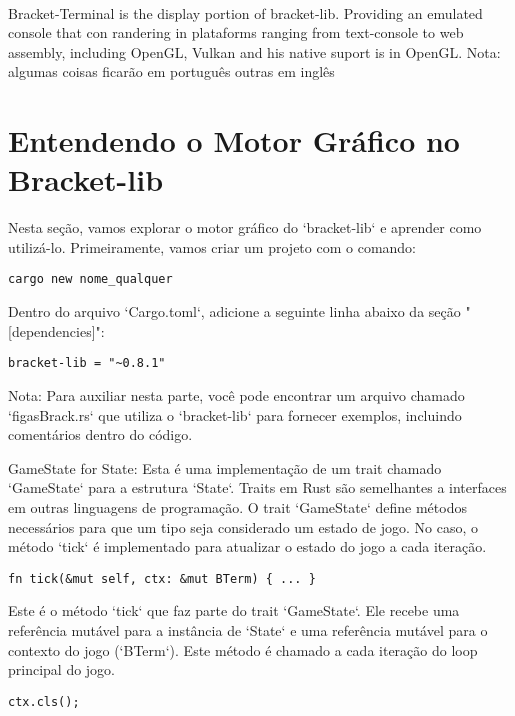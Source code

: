 \documentclass{article}
\begin{document}
\\

Bracket-Terminal is the display portion of bracket-lib. Providing an emulated console that con randering in plataforms ranging from text-console to web assembly, including OpenGL, Vulkan and his native suport is in OpenGL. Nota: algumas coisas ficarão em português outras em inglês  

\section{Entendendo o Motor Gráfico no Bracket-lib}

Nesta seção, vamos explorar o motor gráfico do `bracket-lib` e aprender como utilizá-lo. Primeiramente, vamos criar um projeto com o comando:

\begin{verbatim}
cargo new nome_qualquer
\end{verbatim}

Dentro do arquivo `Cargo.toml`, adicione a seguinte linha abaixo da seção "[dependencies]":

\begin{verbatim}
bracket-lib = "~0.8.1"
\end{verbatim}

Nota: Para auxiliar nesta parte, você pode encontrar um arquivo chamado `figasBrack.rs` que utiliza o `bracket-lib` para fornecer exemplos, incluindo comentários dentro do código.

\impl GameState for State: Esta é uma implementação de um trait chamado `GameState` para a estrutura `State`. Traits em Rust são semelhantes a interfaces em outras linguagens de programação. O trait `GameState` define métodos necessários para que um tipo seja considerado um estado de jogo. No caso, o método `tick` é implementado para atualizar o estado do jogo a cada iteração.

\begin{verbatim}
fn tick(&mut self, ctx: &mut BTerm) { ... }
\end{verbatim}

Este é o método `tick` que faz parte do trait `GameState`. Ele recebe uma referência mutável para a instância de `State` e uma referência mutável para o contexto do jogo (`BTerm`). Este método é chamado a cada iteração do loop principal do jogo.

\begin{verbatim}
ctx.cls();
\end{verbatim}
\end{document}
